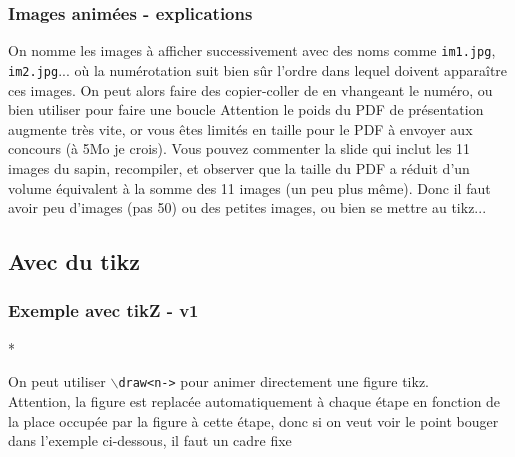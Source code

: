 \begin{frame}
  \frametitle{Images animées - explications}
  
  \begin{itemize}
    \flch On nomme les images à afficher successivement avec des noms comme \texttt{im1.jpg}, \texttt{im2.jpg}...
    où la numérotation suit bien sûr l'ordre dans lequel doivent apparaître ces images.
    \flch On peut alors faire des copier-coller de  en vhangeant le numéro, ou bien utiliser \lin{\foreach} pour faire une boucle
    \flch Attention le poids du PDF de présentation augmente très vite, or vous êtes limités en taille pour le PDF à envoyer aux concours (à 5Mo je crois).
    Vous pouvez commenter la slide qui inclut les 11 images du sapin, recompiler,  et observer que la taille du PDF a réduit d'un volume équivalent à la somme des 11 images (un peu plus même).
    Donc il faut avoir peu d'images (pas 50) ou des petites images, ou bien se mettre au tikz...
  \end{itemize}
\end{frame}




\subsection{Avec du tikz}
\begin{frame} [fragile]
  \frametitle{Exemple avec tikZ - v1}*
  
  On peut utiliser  \texttt{$\backslash$draw<n->} pour animer directement
  une figure tikz.\\[0.2cm]
  \alert{Attention}, la figure est replacée automatiquement à chaque étape en fonction de la place occupée par la figure à cette étape, donc si on veut voir le point bouger dans l'exemple ci-dessous, il faut un cadre fixe
  \begin{center}
  \end{center}

\end{frame}

